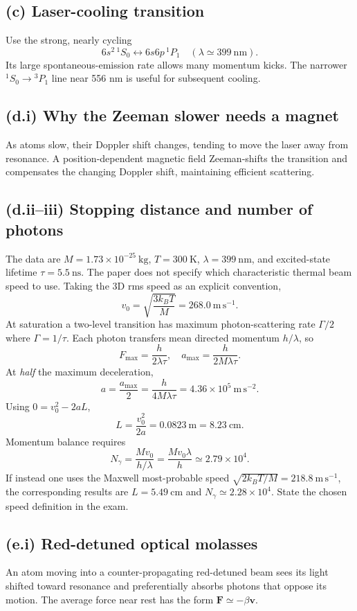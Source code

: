 \subsection*{(c) Laser-cooling transition}
Use the strong, nearly cycling
\[
\boxed{6s^2\,{}^1S_0\longleftrightarrow
6s6p\,{}^1P_1\quad(\lambda\simeq399~\mathrm{nm})}.
\]
Its large spontaneous-emission rate allows many
momentum kicks. The narrower
\({}^1S_0\to{}^3P_1\) line near 556 nm
is useful for subsequent cooling.

\subsection*{(d.i) Why the Zeeman slower needs a magnet}
As atoms slow, their Doppler shift changes,
tending to move the laser away from resonance.
A position-dependent magnetic field Zeeman-shifts
the transition and compensates the changing
Doppler shift, maintaining efficient scattering.

\subsection*{(d.ii--iii) Stopping distance and number of photons}
The data are \(M=1.73\times10^{-25}~\mathrm{kg}\),
\(T=300~\mathrm{K}\), \(\lambda=399~\mathrm{nm}\),
and excited-state lifetime \(\tau=5.5~\mathrm{ns}\).
The paper does not specify which characteristic
thermal beam speed to use. Taking the
3D rms speed as an explicit convention,
\[
v_0=\sqrt{\frac{3k_BT}{M}}=
\boxed{268.0~\mathrm{m\,s^{-1}}}.
\]
At saturation a two-level transition has
maximum photon-scattering rate \(\Gamma/2\)
where \(\Gamma=1/\tau\).
Each photon transfers mean directed momentum
\(h/\lambda\), so
\[
F_{\max}=\frac{h}{2\lambda\tau},\quad
a_{\max}=\frac{h}{2M\lambda\tau}.
\]
At \emph{half} the maximum deceleration,
\[
a=\frac{a_{\max}}2
=\frac{h}{4M\lambda\tau}
=\boxed{4.36\times10^5~\mathrm{m\,s^{-2}}}.
\]
Using \(0=v_0^2-2aL\),
\[
\boxed{L=\frac{v_0^2}{2a}=0.0823~\mathrm{m}
=8.23~\mathrm{cm}}.
\]
Momentum balance requires
\[
\boxed{N_\gamma=\frac{Mv_0}{h/\lambda}
=\frac{Mv_0\lambda}{h}\simeq2.79\times10^4}.
\]
If instead one uses the Maxwell most-probable
speed \(\sqrt{2k_BT/M}=218.8~\mathrm{m\,s^{-1}}\),
the corresponding results are
\(L=5.49~\mathrm{cm}\) and
\(N_\gamma\simeq2.28\times10^4\).
State the chosen speed definition in the exam.

\subsection*{(e.i) Red-detuned optical molasses}
An atom moving into a counter-propagating
red-detuned beam sees its light shifted toward
resonance and preferentially absorbs photons
that oppose its motion. The average force near
rest has the form \(\mathbf F\simeq-\beta\mathbf v\).


